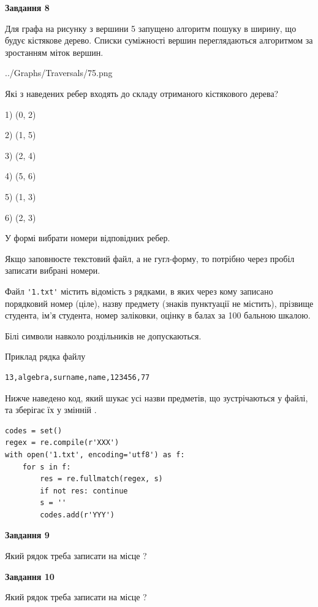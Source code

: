 \documentclass[12pt, ukrainian]{article}
\def\code#1{\Verb!#1!}
\begin{document}
{\begin {large}
{\begin {center}\textbf{Завдання 8}\end {center}}\par
Для графа на рисунку з вершини 5 запущено алгоритм пошуку в ширину, що будує кістякове дерево. Списки суміжності вершин переглядаються алгоритмом за зростанням міток вершин.\par
\begin{center}
	{../Graphs/Traversals/75.png}
\end{center}
\par Які з наведених ребер входять до складу отриманого кістякового дерева?\par
1) (0, 2)\par
2) (1, 5)\par
3) (2, 4)\par
4) (5, 6)\par
5) (1, 3)\par
6) (2, 3)\par
{\vskip 15pt} У формі вибрати номери відповідних ребер.


Якщо заповнюєте текстовий файл, а не гугл-форму, то потрібно через пробіл записа\-ти вибрані номери.\par
\newpage


Файл \code{'1.txt'} містить відомість з рядками, в яких через кому записано поряд\-ковий номер (ціле), назву предмету (знаків пунктуації не містить), прізвище студента, ім'я студента, номер заліковки, оцінку в балах за 100 бальною шкалою.

Білі символи навколо роздільників не допускаються.

Приклад рядка файлу



\begin{verbatim}
13,algebra,surname,name,123456,77
\end{verbatim}


Нижче наведено код, який шукає усі назви предметів, що зустрічаються у файлі, та зберігає їх у змінній .



\begin{verbatim}
codes = set()
regex = re.compile(r'XXX')
with open('1.txt', encoding='utf8') as f:
    for s in f:
        res = re.fullmatch(regex, s)
        if not res: continue
        s = ''
        codes.add(r'YYY')
\end{verbatim}


{\begin {center}\textbf{Завдання 9}\end {center}}\par
Який рядок треба записати на місце  ?\par
\vspace{5mm}


{\begin {center}\textbf{Завдання 10}\end {center}}\par
Який рядок треба записати на місце  ?\par


\newpage


\end {large}}
\end{document}
